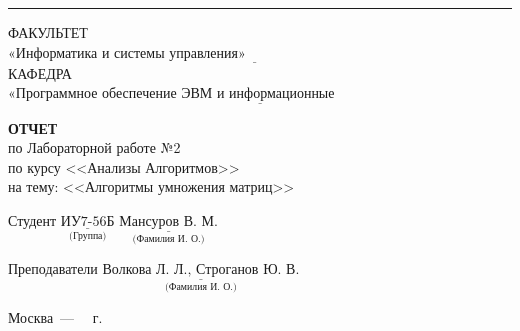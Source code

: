 \begin{titlepage}
	\noindent\rule{18cm}{3pt}
	\newline\newline
	\noindent ФАКУЛЬТЕТ $\underline{\text{«Информатика и системы управления»~~~~~~~~~~~~~~~~~~~~~~~~~~~~~~~~~~~~~~~~~~~~~~~~~~~~~~~}}$ \newline\newline
	\noindent КАФЕДРА $\underline{\text{«Программное обеспечение ЭВМ и информационные технологии»~~~~~~~~~~~~~~~~~~~~~~~}}$\newline\newline\newline\newline\newline\newline\newline
	
	
	\begin{center}
		\textbf{ОТЧЕТ} \\
		по Лабораторной работе №2\\
		по курсу <<Анализы Алгоритмов>> \\
		на тему: <<Алгоритмы умножения матриц>>
	\end{center}

	\vfill
	\vfill
	\vfill
	Студент $\underset{\text{(Группа)}}{\underline{\text{ИУ7-56Б}}}$
	\hfill
	$\underset{\text{(Фамилия~И.~О.)}}{\underline{\text{Мансуров~В.~М.}}}$
	
	Преподаватели 
	\hfill
	$\underset{\text{(Фамилия~И.~О.)}}{\underline{\text{Волкова~Л.~Л., Строганов~Ю.~В.}}}$
	
	\begin{center}
		\vfill
		Москва~---~\the\year
		~г.
	\end{center}
	\restoregeometry
\end{titlepage}

